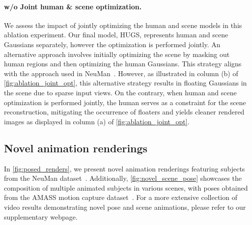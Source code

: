 \paragraph{w/o Joint human \& scene optimization.} We assess the impact of jointly optimizing the human and scene models in this ablation experiment. Our final model, HUGS, represents human and scene Gaussians separately, however the optimization is performed jointly. An alternative approach involves initially optimizing the scene by masking out human regions and then optimizing the human Gaussians. This strategy aligns with the approach used in NeuMan~\cite{jiang2022neuman}. However, as illustrated in column (b) of \cref{fig:ablation_joint_opt}, this alternative strategy results in floating Gaussians in the scene due to sparse input views. On the contrary, when human and scene optimization is performed jointly, the human serves as a constraint for the scene reconstruction, mitigating the occurrence of floaters and yields cleaner rendered images as displayed in column (a) of \cref{fig:ablation_joint_opt}.




\subsection{Novel animation renderings}

In \cref{fig:posed_renders}, we present novel animation renderings featuring subjects from the NeuMan dataset~\cite{jiang2022neuman}. Additionally, \cref{fig:novel_scene_pose} showcases the composition of multiple animated subjects in various scenes, with poses obtained from the AMASS motion capture dataset~\cite{AMASS:ICCV:2019}. For a more extensive collection of video results demonstrating novel pose and scene animations, please refer to our supplementary webpage.


